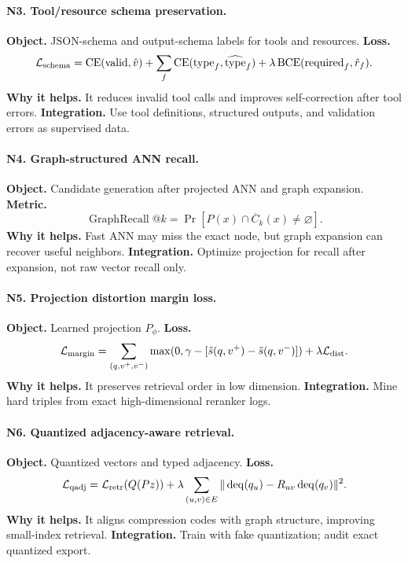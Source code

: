\documentclass[11pt]{article}
\newcommand{\loss}{\mathcal{L}}
\numberwithin{equation}{section}
\begin{document}
\paragraph{N3. Tool/resource schema preservation.}
\textbf{Object.} JSON-schema and output-schema labels for tools and resources. \textbf{Loss.}
\begin{equation}
\loss_{\rm schema}=\operatorname{CE}(\mathrm{valid},\hat v)+\sum_f\operatorname{CE}(\mathrm{type}_f,\widehat{\mathrm{type}}_f)+\lambda\operatorname{BCE}(\mathrm{required}_f,\hat r_f).
\end{equation}
\textbf{Why it helps.} It reduces invalid tool calls and improves self-correction after tool errors. \textbf{Integration.} Use tool definitions, structured outputs, and validation errors as supervised data.

\paragraph{N4. Graph-structured ANN recall.}
\textbf{Object.} Candidate generation after projected ANN and graph expansion. \textbf{Metric.}
\begin{equation}
\operatorname{GraphRecall}@k=\Pr[P(x)\cap \overline C_k(x)\ne\varnothing].
\end{equation}
\textbf{Why it helps.} Fast ANN may miss the exact node, but graph expansion can recover useful neighbors. \textbf{Integration.} Optimize projection for recall after expansion, not raw vector recall only.

\paragraph{N5. Projection distortion margin loss.}
\textbf{Object.} Learned projection $P_\phi$. \textbf{Loss.}
\begin{equation}
\loss_{\rm margin}=\sum_{(q,v^+,v^-)}\max(0,\gamma-[\tilde s(q,v^+)-\tilde s(q,v^-)])+\lambda\loss_{\rm dist}.
\end{equation}
\textbf{Why it helps.} It preserves retrieval order in low dimension. \textbf{Integration.} Mine hard triples from exact high-dimensional reranker logs.

\paragraph{N6. Quantized adjacency-aware retrieval.}
\textbf{Object.} Quantized vectors and typed adjacency. \textbf{Loss.}
\begin{equation}
\loss_{\rm qadj}=\loss_{\rm retr}(Q(Pz))+\lambda\sum_{(u,v)\in E}\|\operatorname{deq}(q_u)-R_{uv}\operatorname{deq}(q_v)\|^2.
\end{equation}
\textbf{Why it helps.} It aligns compression codes with graph structure, improving small-index retrieval. \textbf{Integration.} Train with fake quantization; audit exact quantized export.
\end{document}
